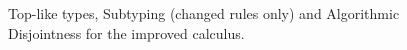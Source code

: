 \begin{figure}[t]




  \caption{Top-like types, Subtyping (changed rules only) and Algorithmic Disjointness for the improved calculus.}
  \label{fig:tltypesextdis}
\end{figure}

